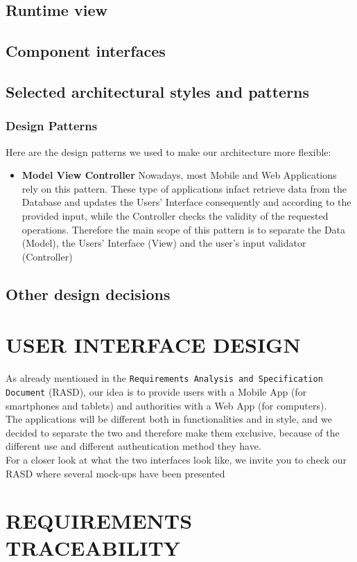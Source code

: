 \documentclass[12pt,a4paper]{article}
\begin{document}
\subsection{Runtime view}
\subsection{Component interfaces}
\subsection{Selected architectural styles and patterns}
\subsubsection{Design Patterns}
Here are the design patterns we used to make our architecture more flexible:
\begin{itemize}
\item \textbf{Model View Controller}
Nowadays, most Mobile and Web Applications rely on this pattern. These type of applications infact retrieve data from the Database and updates the Users' Interface consequently and according to the provided input, while the Controller checks the validity of the requested operations. Therefore the main scope of this pattern is to separate the Data (Model), the Users' Interface (View) and the user's input validator (Controller)
\end{itemize}
\subsection{Other design decisions}
\section{USER INTERFACE DESIGN}
As already mentioned in the \texttt{Requirements Analysis and Specification Document} (RASD), our idea is to provide users with a Mobile App (for smartphones and tablets) and authorities with a Web App (for computers).\\ The applications will be different both in functionalities and in style, and we decided to separate the two and therefore make them exclusive, because of the different use and different authentication method they have.\\ For a closer look at what the two interfaces look like, we invite you to check our RASD where several mock-ups have been presented
\section{REQUIREMENTS TRACEABILITY}
\end{document}
